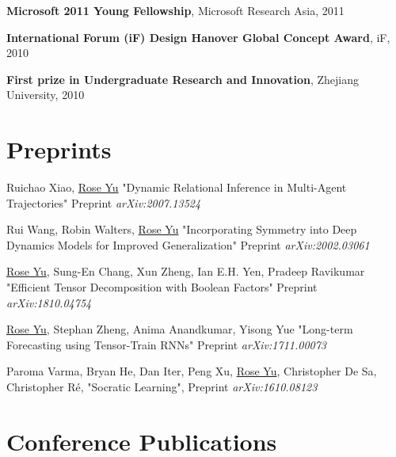 \documentclass[margin,line]{res}
\begin{document}
\begin{resume}
\textbf{Microsoft 2011 Young Fellowship}, Microsoft Research Asia, 2011


\textbf{International Forum (iF) Design Hanover Global Concept Award}, iF, 2010 

\textbf{First prize in Undergraduate Research and Innovation}, Zhejiang University, 2010   





\section{\sc Preprints}
\begin{enumerate}[label={[P\arabic*]}]
\item Ruichao Xiao, \underline{Rose Yu}
"Dynamic Relational Inference in Multi-Agent Trajectories"
Preprint \textit{arXiv:2007.13524}


     
\item Rui Wang, Robin Walters, \underline{Rose Yu}
"Incorporating Symmetry into Deep Dynamics Models for Improved Generalization"
Preprint \textit{arXiv:2002.03061}


\item \underline{Rose Yu}, Sung-En Chang, Xun Zheng, Ian E.H. Yen, Pradeep Ravikumar
"Efficient Tensor Decomposition with Boolean Factors"
Preprint \textit{arXiv:1810.04754}
	
	
\item \underline{Rose Yu,} Stephan Zheng, Anima Anandkumar, Yisong Yue
"Long-term Forecasting using Tensor-Train RNNs"
Preprint \textit{arXiv:1711.00073}


\item Paroma Varma, Bryan He, Dan Iter, Peng Xu,  \underline{Rose Yu}, Christopher De Sa,  Christopher R\'e,  "Socratic Learning",
Preprint \textit{arXiv:1610.08123}
\end{enumerate}
\section{\sc Conference Publications}


\end{resume}
\end{document}
